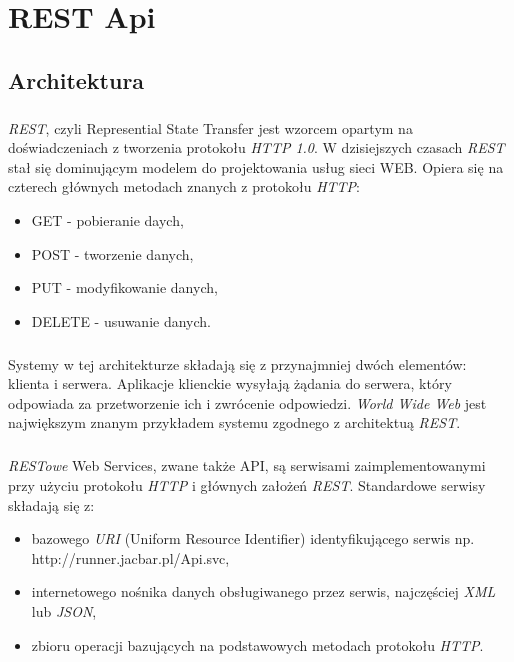 \chapter{REST Api} %
\label{cha:restapi}
\section{Architektura} %
\label{sec:architektura}
\paragraph{} %
\label{par:}
\textit{REST}, czyli Represential State Transfer jest wzorcem opartym na doświadczeniach z tworzenia protokołu \textit{HTTP 1.0}. W dzisiejszych czasach \textit{REST} stał się dominującym modelem do projektowania usług sieci WEB. Opiera się na czterech głównych metodach znanych z protokołu \textit{HTTP}: 

\begin{itemize}
	\item GET - pobieranie daych,
	\item POST - tworzenie danych,
	\item PUT - modyfikowanie danych,
	\item DELETE - usuwanie danych.
\end{itemize}

\paragraph{} %
\label{par:}
Systemy w tej architekturze składają się z przynajmniej dwóch elementów: klienta i serwera. Aplikacje klienckie wysyłają żądania do serwera, który odpowiada za przetworzenie ich i zwrócenie odpowiedzi.
\textit{World Wide Web} jest największym znanym przykładem systemu zgodnego z architektuą \textit{REST}.

\paragraph{} %
\label{par:}
\textit{RESTowe} Web Services, zwane także API, są serwisami zaimplementowanymi przy użyciu protokołu \textit{HTTP} i głównych założeń \textit{REST}. Standardowe serwisy składają się z:
\begin{itemize}
	\item bazowego \textit{URI} (Uniform Resource Identifier) identyfikującego serwis np. http://runner.jacbar.pl/Api.svc,
	\item internetowego nośnika danych obsługiwanego przez serwis, najczęściej \textit{XML} lub \textit{JSON},
	\item zbioru operacji bazujących na podstawowych metodach protokołu \textit{HTTP}.
\end{itemize}

